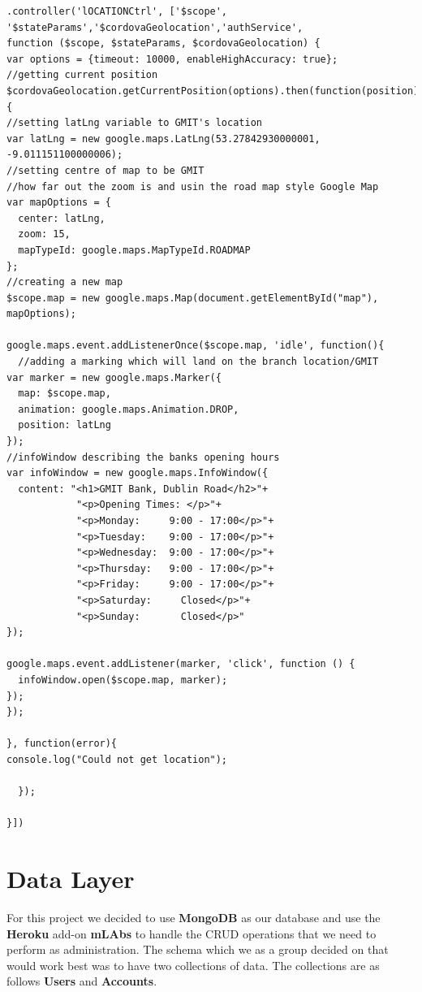 \begin{verbatim}
.controller('lOCATIONCtrl', ['$scope',
'$stateParams','$cordovaGeolocation','authService',
function ($scope, $stateParams, $cordovaGeolocation) {
var options = {timeout: 10000, enableHighAccuracy: true};
//getting current position
$cordovaGeolocation.getCurrentPosition(options).then(function(position){
//setting latLng variable to GMIT's location
var latLng = new google.maps.LatLng(53.27842930000001, -9.011151100000006);
//setting centre of map to be GMIT
//how far out the zoom is and usin the road map style Google Map
var mapOptions = {
  center: latLng,
  zoom: 15,
  mapTypeId: google.maps.MapTypeId.ROADMAP
};
//creating a new map
$scope.map = new google.maps.Map(document.getElementById("map"), mapOptions);

google.maps.event.addListenerOnce($scope.map, 'idle', function(){
  //adding a marking which will land on the branch location/GMIT
var marker = new google.maps.Marker({
  map: $scope.map,
  animation: google.maps.Animation.DROP,
  position: latLng
});
//infoWindow describing the banks opening hours
var infoWindow = new google.maps.InfoWindow({
  content: "<h1>GMIT Bank, Dublin Road</h2>"+
            "<p>Opening Times: </p>"+
            "<p>Monday:     9:00 - 17:00</p>"+
            "<p>Tuesday:    9:00 - 17:00</p>"+
            "<p>Wednesday:  9:00 - 17:00</p>"+
            "<p>Thursday:   9:00 - 17:00</p>"+
            "<p>Friday:     9:00 - 17:00</p>"+
            "<p>Saturday:     Closed</p>"+
            "<p>Sunday:       Closed</p>"
});

google.maps.event.addListener(marker, 'click', function () {
  infoWindow.open($scope.map, marker);
});
});

}, function(error){
console.log("Could not get location");

  });

}])
\end{verbatim}

\section{Data Layer} 
For this project we decided to use \textbf{MongoDB} as our database and use the \textbf{Heroku} add-on \textbf{mLAbs} to handle the CRUD operations that we need to perform as administration. The schema which we as a group decided on that would work best was to have two collections of data. The collections are as follows \textbf{Users} and \textbf{Accounts}.\paragraph{}


